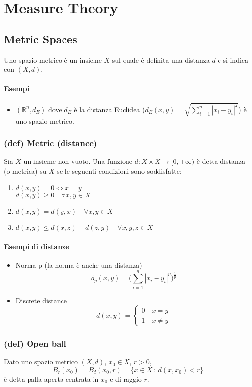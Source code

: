 \section{Measure Theory}
\subsection{Metric Spaces}
Uno spazio metrico è un insieme $X$ sul quale è definita una distanza $d$ e si indica con $(X,d)$.
\paragraph{Esempi}
\begin{itemize}
    \item $(\mathbb R^n, d_E)$ dove $d_E$ è la distanza Euclidea ($d_E(x,y)=\sqrt{\sum_{i=1}^n|x_i-y_i|^2}$) è uno spazio metrico.
\end{itemize}
\subsubsection{(def) Metric (distance)}\label{(def) Metrica (distanza)}
Sia $X$ un insieme non vuoto. Una funzione $d:X\times X\to [0,+\infty)$ è detta distanza (o metrica) su $X$ se le seguenti condizioni sono soddisfatte:
\begin{enumerate}
    \item $d(x,y)=0\iff x=y$\\
     $d(x,y)\geq 0 \quad \forall x,y\in X$
    \item $d(x,y)=d(y,x)\quad \forall x,y\in X$
    \item $d(x,y)\leq d(x,z)+d(z,y)\quad \forall x,y,z\in X$
\end{enumerate}
\paragraph{Esempi di distanze}
\begin{itemize}
    \item Norma p (la norma è anche una distanza)
    $$d_p(x,y)=\Big (\sum_{i=1}^n |x_i-y_i|^p\Big)^{\frac 1p}$$
    \item Discrete distance$$d(x,y)\coloneqq \begin{cases}0\quad x=y\\ 1 \quad x\neq y\end{cases}$$
\end{itemize}
\subsubsection{(def) Open ball}
Dato uno spazio metrico $(X,d)$, $x_0\in X$, $r>0$,
$$B_r(x_0)=B_d(x_0,r)=\{ x\in X\ :\ d(x,x_0)<r\}$$
è detta palla aperta centrata in $x_0$ e di raggio $r$.
